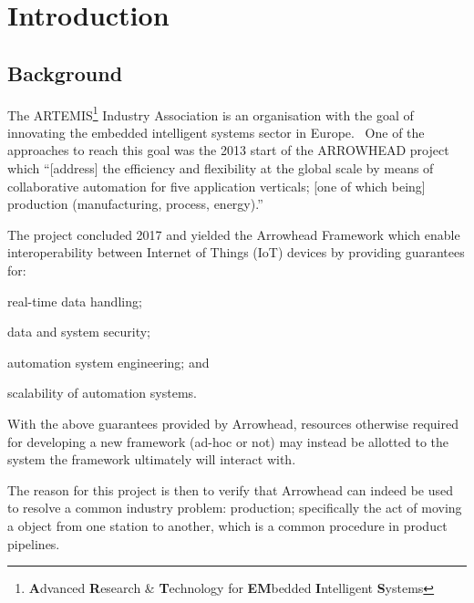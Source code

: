 \section{Introduction}
\subsection{Background}
The ARTEMIS\footnote{\textbf{A}dvanced \textbf{R}esearch \& \textbf{T}echnology for \textbf{EM}bedded \textbf{I}ntelligent \textbf{S}ystems} Industry Association is an organisation with the goal of innovating the embedded intelligent systems sector in Europe.~\parencite{artemis}
One of the approaches to reach this goal was the 2013 start of the ARROWHEAD project which ``[address] the efficiency and flexibility at the global scale by means of collaborative automation for five application verticals; [one of which being] production (manufacturing, process, energy).''~\parencite{arrowhead-project-call}

The project concluded 2017 and yielded the Arrowhead Framework which enable interoperability between Internet of Things (IoT) devices by providing guarantees for:
\begin{inline-enum}
    \item real-time data handling;
    \item data and system security;
    \item automation system engineering; and
    \item scalability of automation systems.
\end{inline-enum}
\parencite{arrowhead-project-about}
With the above guarantees provided by Arrowhead, resources otherwise required for developing a new framework (ad-hoc or not) may instead be allotted to the system the framework ultimately will interact with.

The reason for this project is then to verify that Arrowhead can indeed be used to resolve a common industry problem: production; specifically the act of moving a object from one station to another,
which is a common procedure in product pipelines.


